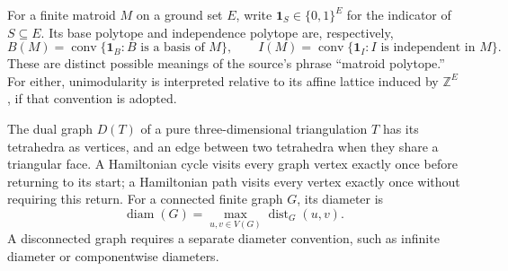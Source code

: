 \documentclass[11pt]{article}
\newcommand{\Z}{\mathbb{Z}}
\begin{document}
For a finite matroid \(M\) on a ground set \(E\), write \(\mathbf{1}_S\in\{0,1\}^E\) for the indicator of \(S\subseteq E\). Its base polytope and independence polytope are, respectively,
\[
 B(M)=\operatorname{conv}\{\mathbf{1}_B:B\text{ is a basis of }M\},\qquad
 I(M)=\operatorname{conv}\{\mathbf{1}_I:I\text{ is independent in }M\}.
\]
These are distinct possible meanings of the source's phrase ``matroid polytope.'' For either, unimodularity is interpreted relative to its affine lattice induced by \(\Z^E\), if that convention is adopted.

The dual graph \(D(T)\) of a pure three-dimensional triangulation \(T\) has its tetrahedra as vertices, and an edge between two tetrahedra when they share a triangular face. A Hamiltonian cycle visits every graph vertex exactly once before returning to its start; a Hamiltonian path visits every vertex exactly once without requiring this return. For a connected finite graph \(G\), its diameter is
\[
 \operatorname{diam}(G)=\max_{u,v\in V(G)}\operatorname{dist}_G(u,v).
\]
A disconnected graph requires a separate diameter convention, such as infinite diameter or componentwise diameters.
\end{document}
